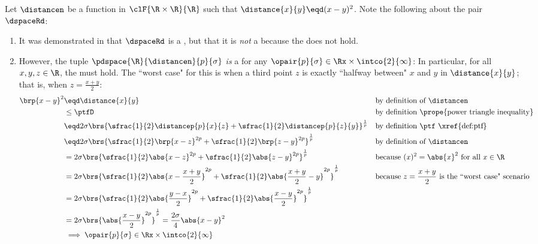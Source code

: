 \begin{example}
\label{ex:pdspace_xy2}
Let $\distancen$ be a function in $\clF{\R\times\R}{\R}$ such that $\distance{x}{y}\eqd(x-y)^2$.
Note the following about the pair $\dspaceRd$:
\begin{enumerate}
  \item It was demonstrated in  that $\dspaceRd$ is a ,
        but that it is \emph{not} a  because the  does not hold.

  \item However, the tuple $\pdspace{\R}{\distancen}{p}{\sigma}$ \emph{is} a 
          for any $\opair{p}{\sigma}\in\Rx\times\intco{2}{\infty}$:
        In particular, for all $x,y,z\in\R$, the   must hold.
        The ``worst case" for this is when a third point $z$ is exactly ``halfway between" $x$ and $y$ in $\distance{x}{y}$; 
        that is, when $z=\frac{x+y}{2}$:
        \begin{align*}
          \brp{x-y}^2
            &\eqd \distance{x}{y}
            && \text{by definition of $\distancen$}
          \\&\le  \ptfD
            && \text{by definition \prope{power triangle inequality}}
          \\&\eqd 2\sigma\brs{\sfrac{1}{2}\distancep{p}{x}{z}+\sfrac{1}{2}\distancep{p}{z}{y}}^\frac{1}{p}
            && \text{by definition $\ptf$ \xref{def:ptf}}
          \\&\eqd  2\sigma\brs{\sfrac{1}{2}\brp{x-z}^{2p}+\sfrac{1}{2}\brp{z-y}^{2p}}^\frac{1}{p}
            && \text{by definition of $\distancen$}
          \\&=     2\sigma\brs{\sfrac{1}{2}\abs{x-z}^{2p}+\sfrac{1}{2}\abs{z-y}^{2p}}^\frac{1}{p}
            && \text{because $(x)^2 = \abs{x}^2$ for all $x\in\R$}
          \\&=     2\sigma\brs{\sfrac{1}{2}\abs{x-\frac{x+y}{2}}^{2p}+\sfrac{1}{2}\abs{\frac{x+y}{2}-y}^{2p}}^\frac{1}{p}
            && \text{because $z=\frac{x+y}{2}$ is the ``worst case" scenario}
          \\&=     2\sigma\brs{\sfrac{1}{2}\abs{\frac{y-x}{2}}^{2p}+\sfrac{1}{2}\abs{\frac{x-y}{2}}^{2p}}^\frac{1}{p}
          \\&=     2\sigma\brs{\abs{\frac{x-y}{2}}^{2p}}^\frac{1}{p}
             =     \frac{2\sigma}{4}\abs{x-y}^{2}
          \\&\implies \opair{p}{\sigma}\in\Rx\times\intco{2}{\infty}
        \end{align*}


\end{enumerate}
\end{example}
